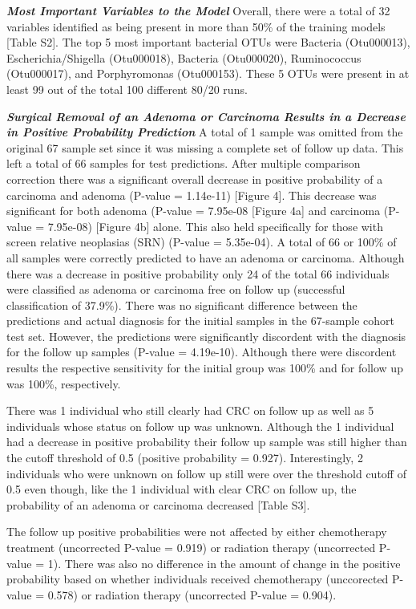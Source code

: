 \documentclass[12pt,]{article}
\begin{document}
\textbf{\emph{Most Important Variables to the Model}} Overall, there
were a total of 32 variables identified as being present in more than
50\% of the training models {[}Table S2{]}. The top 5 most important
bacterial OTUs were Bacteria (Otu000013), Escherichia/Shigella
(Otu000018), Bacteria (Otu000020), Ruminococcus (Otu000017), and
Porphyromonas (Otu000153). These 5 OTUs were present in at least 99 out
of the total 100 different 80/20 runs.

\textbf{\emph{Surgical Removal of an Adenoma or Carcinoma Results in a
Decrease in Positive Probability Prediction}} A total of 1 sample was
omitted from the original 67 sample set since it was missing a complete
set of follow up data. This left a total of 66 samples for test
predictions. After multiple comparison correction there was a
significant overall decrease in positive probability of a carcinoma and
adenoma (P-value = 1.14e-11) {[}Figure 4{]}. This decrease was
significant for both adenoma (P-value = 7.95e-08 {[}Figure 4a{]} and
carcinoma (P-value = 7.95e-08) {[}Figure 4b{]} alone. This also held
specifically for those with screen relative neoplasias (SRN) (P-value =
5.35e-04). A total of 66 or 100\% of all samples were correctly
predicted to have an adenoma or carcinoma. Although there was a decrease
in positive probability only 24 of the total 66 individuals were
classified as adenoma or carcinoma free on follow up (successful
classification of 37.9\%). There was no significant difference between
the predictions and actual diagnosis for the initial samples in the
67-sample cohort test set. However, the predictions were significantly
discordent with the diagnosis for the follow up samples (P-value =
4.19e-10). Although there were discordent results the respective
sensitivity for the initial group was 100\% and for follow up was 100\%,
respectively.

There was 1 individual who still clearly had CRC on follow up as well as
5 individuals whose status on follow up was unknown. Although the 1
individual had a decrease in positive probability their follow up sample
was still higher than the cutoff threshold of 0.5 (positive probability
= 0.927). Interestingly, 2 individuals who were unknown on follow up
still were over the threshold cutoff of 0.5 even though, like the 1
individual with clear CRC on follow up, the probability of an adenoma or
carcinoma decreased {[}Table S3{]}.

The follow up positive probabilities were not affected by either
chemotherapy treatment (uncorrected P-value = 0.919) or radiation
therapy (uncorrected P-value = 1). There was also no difference in the
amount of change in the positive probability based on whether
individuals received chemotherapy (unccorected P-value = 0.578) or
radiation therapy (uncorrected P-value = 0.904).
\end{document}
